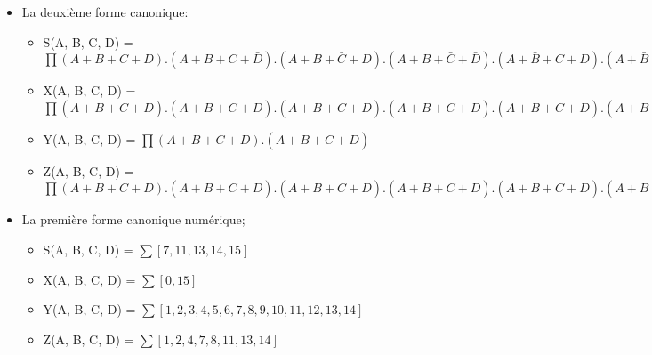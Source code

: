 \begin{enumerate}
\begin{itemize}
\begin{itemize}
\item Z(A, B, C, D) = $\sum \bar A.\bar B.\bar C.D + \bar A.\bar B.C.\bar D + \bar A.B.\bar C.\bar D + \bar A.B.C.D + A.\bar B.\bar C.\bar D + A.\bar B.C.D + A.B.\bar C.D + A.B.C.\bar D$ 


\end{itemize}
\item La deuxième forme canonique:  



\begin{itemize}
\item S(A, B, C, D) = $\prod (A+B+C+D) . (A+B+C+\bar D) . (A+B+\bar C+D) . (A+B+\bar C+\bar D) . (A+\bar B+C+D) . (A+\bar B+C+\bar D) . (A+\bar B+\bar C+D) . (\bar A+B+C+D) . (\bar A+B+C+\bar D) . (\bar A+B+\bar C+D) . (\bar A+\bar B+C+D)$ 


\item X(A, B, C, D) = $\prod (A+B+C+\bar D) . (A+B+\bar C+D) . (A+B+\bar C+\bar D) . (A+\bar B+C+D) . (A+\bar B+C+\bar D) . (A+\bar B+\bar C+D) . (A+\bar B+\bar C+\bar D) . (\bar A+B+C+D) . (\bar A+B+C+\bar D) . (\bar A+B+\bar C+D) . (\bar A+B+\bar C+\bar D) . (\bar A+\bar B+C+D) . (\bar A+\bar B+C+\bar D) . (\bar A+\bar B+\bar C+D)$ 


\item Y(A, B, C, D) = $\prod (A+B+C+D) . (\bar A+\bar B+\bar C+\bar D)$ 


\item Z(A, B, C, D) = $\prod (A+B+C+D) . (A+B+\bar C+\bar D) . (A+\bar B+C+\bar D) . (A+\bar B+\bar C+D) . (\bar A+B+C+\bar D) . (\bar A+B+\bar C+D) . (\bar A+\bar B+C+D) . (\bar A+\bar B+\bar C+\bar D)$ 


\end{itemize}
\item La première forme canonique numérique;  



\begin{itemize}
\item S(A, B, C, D) = $\sum [7, 11, 13, 14, 15]$ 


\item X(A, B, C, D) = $\sum [0, 15]$ 


\item Y(A, B, C, D) = $\sum [1, 2, 3, 4, 5, 6, 7, 8, 9, 10, 11, 12, 13, 14]$ 


\item Z(A, B, C, D) = $\sum [1, 2, 4, 7, 8, 11, 13, 14]$ 



\end{itemize}
\end{itemize}
\end{enumerate}

